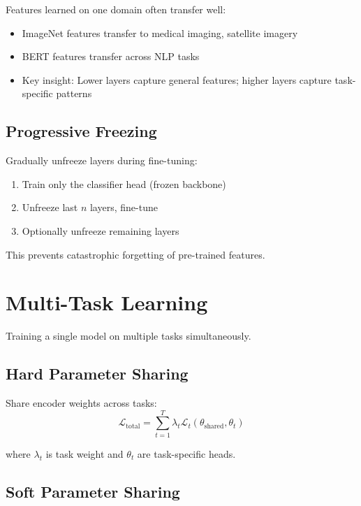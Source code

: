 Features learned on one domain often transfer well:

\begin{itemize}
    \item ImageNet features transfer to medical imaging, satellite imagery
    \item BERT features transfer across NLP tasks
    \item Key insight: Lower layers capture general features; higher layers capture task-specific patterns
\end{itemize}

\subsection{Progressive Freezing}

Gradually unfreeze layers during fine-tuning:
\begin{enumerate}
    \item Train only the classifier head (frozen backbone)
    \item Unfreeze last $n$ layers, fine-tune
    \item Optionally unfreeze remaining layers
\end{enumerate}

This prevents catastrophic forgetting of pre-trained features.

\section{Multi-Task Learning}

Training a single model on multiple tasks simultaneously.

\subsection{Hard Parameter Sharing}

Share encoder weights across tasks:
\begin{equation}
\mathcal{L}_{\text{total}} = \sum_{t=1}^{T} \lambda_t \mathcal{L}_t(\theta_{\text{shared}}, \theta_t)
\end{equation}

where $\lambda_t$ is task weight and $\theta_t$ are task-specific heads.

\subsection{Soft Parameter Sharing}

